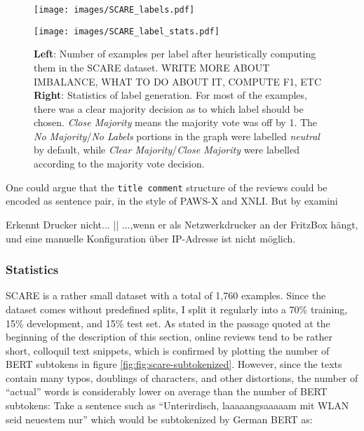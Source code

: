 \begin{figure}
  \begin{minipage}{0.45\linewidth}
  \vspace{0pt}
    \texttt{[image: images/SCARE\_labels.pdf]}
  \end{minipage}
  \hfill
  \begin{minipage}{0.45\linewidth}
  \vspace{0pt}
    \texttt{[image: images/SCARE\_label\_stats.pdf]}
  \end{minipage}
  \label{fig:scare-statistics-preprocess}
  \caption[Accumulated Gains and Losses.]{\textbf{Left}: Number of examples per label after heuristically computing them in the SCARE dataset. {\color{red} WRITE MORE ABOUT IMBALANCE, WHAT TO DO ABOUT IT, COMPUTE F1, ETC} \textbf{Right}: Statistics of label generation. For most of the examples, there was a clear majority decision as to which label should be chosen. \emph{Close Majority} means the majority vote was off by 1. The \emph{No Majority}/\emph{No Labels} portions in the graph were labelled \emph{neutral} by default, while \emph{Clear Majority}/\emph{Close Majority}  were labelled according to the majority vote decision.}
\end{figure}


One could argue that the \texttt{title \textbar \textbar comment} structure of the reviews could be encoded
as sentence pair, in the style of PAWS-X and XNLI. But by examini

\begin{examples}
  \item Erkennt Drucker nicht... || ...,wenn er als Netzwerkdrucker an der FritzBox hängt, und eine manuelle Konfiguration über IP-Adresse ist nicht möglich.
\end{examples}


\subsubsection{Statistics}

SCARE is a rather small dataset with a total of 1,760 examples. Since the dataset comes
without predefined splits, I split it regularly into a 70\% training, 15\% development,
and 15\% test set. As \citeauthor{sanger2016scare} stated in the passage quoted at the
beginning of the description of this section, online reviews tend to be rather short,
colloquil text snippets, which is confirmed by plotting the number of BERT subtokens in
figure \ref{fig:fig:scare-subtokenized}. However, since the texts contain many typos,
doublings of characters, and other distortions, the number of ``actual'' words is
considerably lower on average than the number of BERT subtokens: Take a sentence such
as ``Unterirdisch, laaaaangsaaaaam mit WLAN seid neuestem nur'' which would be subtokenized by German BERT as:


